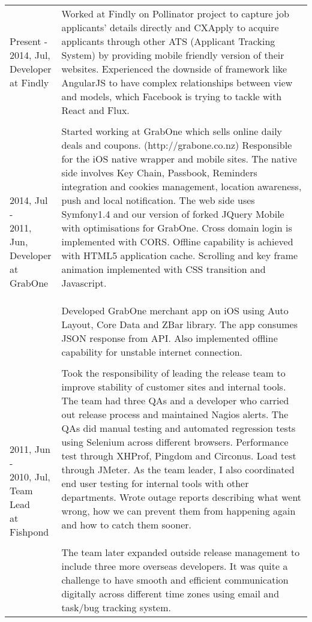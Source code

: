 \begin{resume}
\begin{tabular}{ll}
\parbox[t]{35mm}{Present - \\ 2014, Jul,\\Developer\\at Findly} & \parbox[t]{111mm}{

Worked at Findly on Pollinator project to capture job applicants' details directly and CXApply to acquire applicants through other ATS (Applicant Tracking System) by providing mobile friendly version of their websites. Experienced the downside of framework like AngularJS to have complex relationships between view and models, which Facebook is trying to tackle with React and Flux.

}\\\\
\parbox[t]{35mm}{2014, Jul - \\ 2011, Jun,\\Developer\\at GrabOne} & \parbox[t]{111mm}{

Started working at GrabOne which sells online daily deals and coupons. (http://grabone.co.nz) Responsible for the iOS native wrapper and mobile sites. The native side involves Key Chain, Passbook, Reminders integration and cookies management, location awareness, push and local notification. The web side uses Symfony1.4 and our version of forked JQuery Mobile with optimisations for GrabOne. Cross domain login is implemented with CORS. Offline capability is achieved with HTML5 application cache. Scrolling and key frame animation implemented with CSS transition and Javascript. 
\\\\
Developed GrabOne merchant app on iOS using Auto Layout, Core Data and ZBar library. The app consumes JSON response from API. Also implemented offline capability for unstable internet connection.

}\\\\
\parbox[t]{35mm}{2011, Jun - \\ 2010, Jul,\\Team Lead\\at Fishpond} & \parbox[t]{111mm}{

Took the responsibility of leading the release team to improve stability of customer sites and internal tools. The team had three QAs and a developer who carried out release process and maintained Nagios alerts. The QAs did manual testing and automated regression tests using Selenium across different browsers. Performance test through XHProf, Pingdom and Circonus. Load test through JMeter. As the team leader, I also coordinated end user testing for internal tools with other departments. Wrote outage reports describing what went wrong, how we can prevent them from happening again and how to catch them sooner.
\\\\
The team later expanded outside release management to include three more overseas developers. It was quite a challenge to have smooth and efficient communication digitally across different time zones using email and task/bug tracking system.

}
\end{tabular}
\end{resume}
